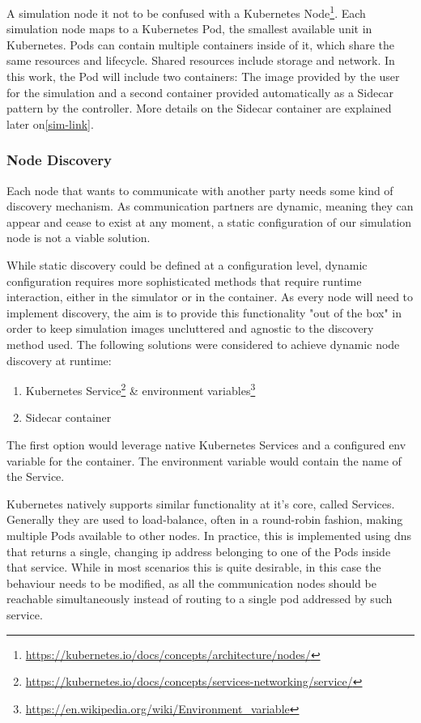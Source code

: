 A simulation node it not to be confused with a Kubernetes Node\footnote{\url{https://kubernetes.io/docs/concepts/architecture/nodes/}}. Each simulation node maps to a Kubernetes Pod, the smallest available unit in Kubernetes. Pods can contain multiple containers inside of it, which share the same resources and lifecycle. Shared resources include storage and network.
In this work, the Pod will include two containers: The image provided by the user for the simulation and a second container provided automatically as a Sidecar pattern\cite{azure-sidecar} by the controller.
More details on the Sidecar container are explained later on\ref{sim-link}.

\subsubsection{Node Discovery}

Each node that wants to communicate with another party needs some kind of discovery mechanism. As communication partners are dynamic, meaning they can appear and cease to exist at any moment, a static configuration of our simulation node is not a viable solution.

While static discovery could be defined at a configuration level, dynamic configuration requires more sophisticated methods that require runtime interaction, either in the simulator or in the container. As every node will need to implement discovery, the aim is to provide this functionality "out of the box" in order to keep simulation images uncluttered and agnostic to the discovery method used.
The following solutions were considered to achieve dynamic node discovery at runtime:

\begin{enumerate}
  \item Kubernetes Service\footnote{\url{https://kubernetes.io/docs/concepts/services-networking/service/}} \& environment variables\footnote{\url{https://en.wikipedia.org/wiki/Environment_variable}}
  \item Sidecar container
\end{enumerate}

The first option would leverage native Kubernetes Services and a configured env variable for the container. The environment variable would contain the name of the Service.

Kubernetes natively supports similar functionality at it's core, called Services. Generally they are used to load-balance, often in a round-robin fashion, making multiple Pods available to other nodes. In practice, this is implemented using \ac{dns} that returns a single, changing \ac{ip} address belonging to one of the Pods inside that service. While in most scenarios this is quite desirable, in this case the behaviour needs to be modified, as all the communication nodes should be reachable simultaneously instead of routing to a single pod addressed by such service.

